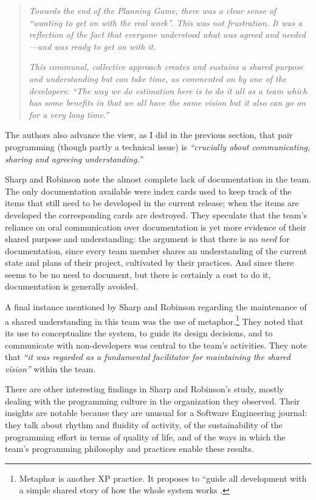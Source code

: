\begin{quote}
\emph{Towards the end of the Planning Game, there was a clear sense of  ``wanting to get on with the real work''. This was not frustration. It was a reflection of the fact that everyone understood what was agreed and needed---and was ready to get on with it.}

\emph{This communal, collective approach creates and sustains a shared purpose and understanding but can take time, as commented on by one of the developers: ``The way we do estimation here is to do it all as a team which has some benefits in that we all have the same vision but it also can go on for a very long time.''}
\end{quote}

The authors also advance the view, as I did in the previous section, that pair programming (though partly a technical issue) is \emph{``crucially about communicating, sharing and agreeing understanding.''}

Sharp and Robinson note the almost complete lack of documentation in the team. The only documentation available were index cards used to keep track of the items that still need to be developed in the current release; when the items are developed the corresponding cards are destroyed. They speculate that the team's reliance on oral communication over documentation is yet more evidence of their shared purpose and understanding: the argument is that there is no \emph{need} for documentation, since every team member shares an understanding of the current state and plans of their project, cultivated by their practices. And since there seems to be no need to document, but there is certainly a cost to do it, documentation is generally avoided.

A final instance mentioned by Sharp and Robinson regarding the maintenance of a shared understanding in this team was the use of metaphor.\footnote{Metaphor is another XP practice. It proposes to ``guide all development with a simple shared story of how the whole system works \cite{Beck1999}.} They noted that its use to conceptualize the system, to guide its design decisions, and to communicate with non-developers was central to the team's activities. They note that \emph{``it was regarded as a fundamental facilitator for maintaining the shared vision''} within the team.

There are other interesting findings in Sharp and Robinson's study, mostly dealing with the programming culture in the organization they observed. Their insights are notable because they are unusual for a Software Engineering journal: they talk about rhythm and fluidity of activity, of the sustainability of the programming effort in terms of quality of life, and of the ways in which the team's programming philosophy and practices enable these results.

